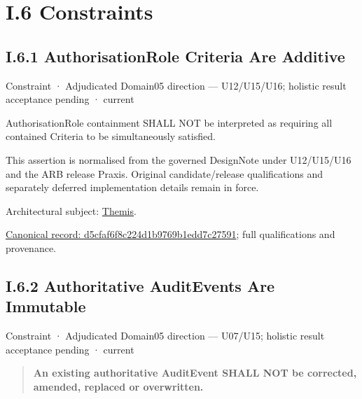 \chapter*{I.6 Constraints}
\label{navigation:I.6}

\section*{I.6.1 AuthorisationRole Criteria Are Additive}
\label{navigation:I.6.1}

\label{element:d5cfaf6f8c224d1b9769b1edd7c27591}
{\small Constraint · Adjudicated Domain05 direction — U12/U15/U16; holistic result acceptance pending · current}\par

AuthorisationRole containment SHALL NOT be interpreted as requiring all contained Criteria to be simultaneously satisfied.



This assertion is normalised from the governed DesignNote under U12/U15/U16 and the ARB release Praxis. Original candidate/release qualifications and separately deferred implementation details remain in force.



Architectural subject: \hyperref[element:899d34ec491948b68aad09e507dea6d1]{Themis}.


{\footnotesize \href{../../../../continuum/motivation/constraint/d5cfaf6f8c224d1b9769b1edd7c27591.md}{Canonical record: d5cfaf6f8c224d1b9769b1edd7c27591}; full qualifications and provenance.}\par
\section*{I.6.2 Authoritative AuditEvents Are Immutable}
\label{navigation:I.6.2}

\label{element:21eb20cdc600411cb71fbfe2abce4dbe}
{\small Constraint · Adjudicated Domain05 direction — U07/U15; holistic result acceptance pending · current}\par

\begin{quote}


\textbf{An existing authoritative AuditEvent SHALL NOT be corrected, amended, replaced or overwritten.}



\end{quote}


